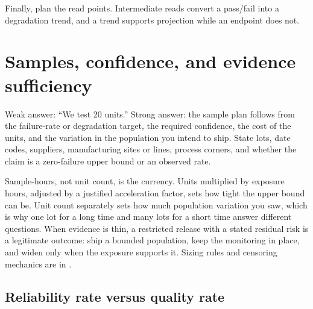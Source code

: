 Finally, plan the read points. Intermediate reads convert a pass/fail into a
degradation trend, and a trend supports projection while an endpoint does not.

\section{Samples, confidence, and evidence sufficiency}
\label{sec:qual-sample-strategy}

Weak answer: ``We test 20 units.'' Strong answer: the sample plan follows from
the failure-rate or degradation target, the required confidence, the cost of
the units, and the variation in the population you intend to ship. State lots,
date codes, suppliers, manufacturing sites or lines, process corners, and
whether the claim is a zero-failure upper bound or an observed rate.


Sample-hours, not unit count, is the currency. Units multiplied by exposure
hours, adjusted by a justified acceleration factor, sets how tight the upper
bound can be. Unit count separately sets how much population variation you saw,
which is why one lot for a long time and many lots for a short time answer
different questions. When evidence is thin, a restricted release with a stated
residual risk is a legitimate outcome: ship a bounded population, keep the
monitoring in place, and widen only when the exposure supports it. Sizing rules
and censoring mechanics are in .


\subsection{Reliability rate versus quality rate}
\label{sec:fit-dppm}

